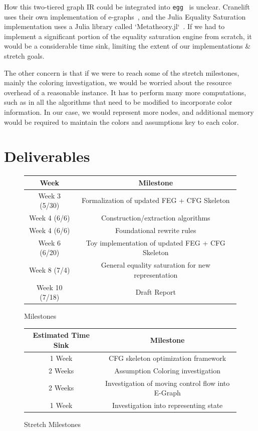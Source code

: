 \documentclass{article}
\begin{document}
How this two-tiered graph IR could be integrated into \verb|egg|~\cite{Willsey_2021} is unclear. Cranelift uses their own implementation of e-graphs~\cite{bytecodealliance_2025}, and the Julia Equality Saturation implementation uses a Julia library called `Metatheory.jl`~\cite{Cheli2021}. If we had to implement a significant portion of the equality saturation engine from scratch, it would be a considerable time sink, limiting the extent of our implementations \& stretch goals.

The other concern is that if we were to reach some of the stretch milestones, mainly the coloring investigation, we would be worried about the resource overhead of a reasonable instance. It has to perform many more computations, such as in all the algorithms that need to be modified to incorporate color information. In our case, we would represent more nodes, and additional memory would be required to maintain the colors and assumptions key to each color.



\section{Deliverables}

\begin{figure}[H]
    \centering
    \begin{tabular}{||c|c||}\hline
        Week            & Milestone\\ [0.5ex] \hline\hline
        Week 3 (5/30)   & Formalization of updated FEG + CFG Skeleton \\\hline
        Week 4 (6/6)    & Construction/extraction algorithms \\\hline
        Week 4 (6/6)    & Foundational rewrite rules \\\hline
        Week 6 (6/20)   & Toy implementation of updated FEG + CFG Skeleton \\\hline
        Week 8 (7/4)    & General equality saturation for new representation \\\hline
        Week 10 (7/18)  & Draft Report \\\hline
    \end{tabular}
    \caption{Milestones}
\end{figure}

\begin{figure}[H]
    \centering
    \begin{tabular}{||c|c||}\hline
        Estimated Time Sink & Milestone \\ [0.5ex] \hline\hline
        1 Week & CFG skeleton optimization framework \\\hline
        2 Weeks & Assumption Coloring investigation \\\hline
        2 Weeks & Investigation of moving control flow into E-Graph \\\hline
        1 Week  & Investigation into representing state \\\hline
    \end{tabular}
    \caption{Stretch Milestones}
\end{figure}
\end{document}
